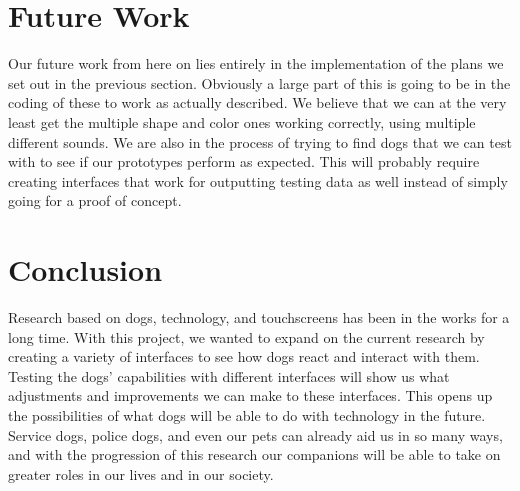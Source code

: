 \documentclass{sigchi}
\begin{document}
    \section{Future Work}
        Our future work from here on lies entirely in the implementation of the plans we set out in the previous section. Obviously a large part of this is going to be in the coding of these to work as actually described. We believe that we can at the very least get the multiple shape and color ones working correctly, using multiple different sounds. We are also in the process of trying to find dogs that we can test with to see if our prototypes perform as expected. This will probably require creating interfaces that work for outputting testing data as well instead of simply going for a proof of concept.
    
    \section{Conclusion}
        Research based on dogs, technology, and touchscreens has been in the works for a long time. With this project, we wanted to expand on the current research by creating a variety of interfaces to see how dogs react and interact with them. Testing the dogs’ capabilities with different interfaces will show us what adjustments and improvements we can make to these interfaces. This opens up the possibilities of what dogs will be able to do with technology in the future. Service dogs, police dogs, and even our pets can already aid us in so many ways, and with the progression of this research our companions will be able to take on greater roles in our lives and in our society.

    
    
\end{document}
